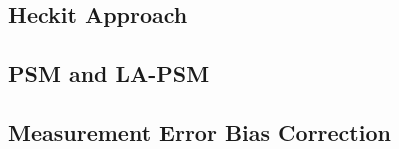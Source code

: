 \documentclass{article}
\begin{document}
\subsection{Heckit Approach}

\subsection{PSM and LA-PSM}

\subsection{Measurement Error Bias Correction}

\pagebreak


% 
\end{document}
